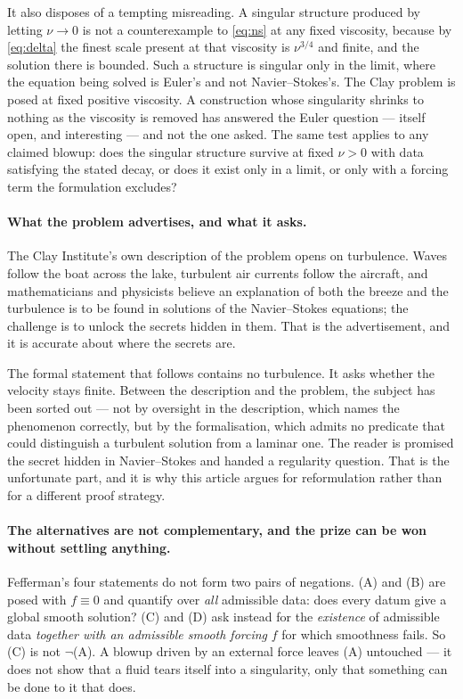 \documentclass[11pt]{article}
\begin{document}
It also disposes of a tempting misreading. A singular structure produced by letting $\nu\to0$ is not
a counterexample to \eqref{eq:ns} at any fixed viscosity, because by \eqref{eq:delta} the finest
scale present at that viscosity is $\nu^{3/4}$ and finite, and the solution there is bounded. Such a structure is
singular only in the limit, where the equation being solved is Euler's and not Navier--Stokes's. The
Clay problem is posed at fixed positive viscosity. A construction whose singularity shrinks to
nothing as the viscosity is removed has answered the Euler question --- itself open, and interesting
--- and not the one asked. The same test applies to any claimed blowup: does the singular structure
survive at fixed $\nu>0$ with data satisfying the stated decay, or does it exist only in a limit, or
only with a forcing term the formulation excludes?

\paragraph{What the problem advertises, and what it asks.} The Clay Institute's own description of
the problem opens on turbulence. Waves follow the boat across the lake, turbulent air currents
follow the aircraft, and mathematicians and physicists believe an explanation of both the breeze and
the turbulence is to be found in solutions of the Navier--Stokes equations; the challenge is to
unlock the secrets hidden in them. That is the advertisement, and it is accurate about where the
secrets are.

The formal statement that follows contains no turbulence. It asks whether the velocity stays finite.
Between the description and the problem, the subject has been sorted out --- not by oversight in the
description, which names the phenomenon correctly, but by the formalisation, which admits no
predicate that could distinguish a turbulent solution from a laminar one. The reader is promised the
secret hidden in Navier--Stokes and handed a regularity question. That is the unfortunate part, and
it is why this article argues for reformulation rather than for a different proof strategy.

\paragraph{The alternatives are not complementary, and the prize can be won without settling
anything.} Fefferman's four statements do not form two pairs of negations. (A) and (B) are posed with
$f\equiv0$ and quantify over \emph{all} admissible data: does every datum give a global smooth
solution? (C) and (D) ask instead for the \emph{existence} of admissible data \emph{together with an
admissible smooth forcing} $f$ for which smoothness fails. So (C) is not $\neg$(A). A blowup driven
by an external force leaves (A) untouched --- it does not show that a fluid tears itself into a
singularity, only that something can be done to it that does.
\end{document}
